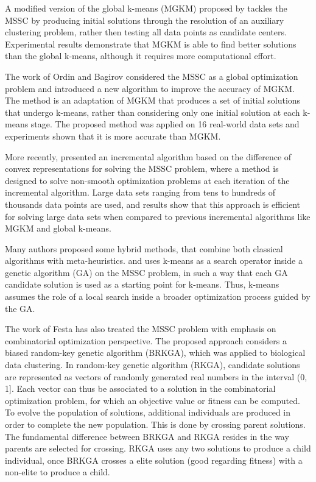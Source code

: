A modified version of the global k-means (MGKM) proposed by \cite{Bagirov2008} tackles the MSSC by producing initial solutions through the resolution of an auxiliary clustering problem, rather then testing all data points as candidate centers. Experimental results demonstrate that MGKM is able to find better solutions than the global k-means, although it requires more computational effort.
 
The work of Ordin and Bagirov \cite{Ordin2014} considered the MSSC as a global optimization problem and introduced a new algorithm to improve the accuracy of MGKM. The method is an adaptation of MGKM that produces a set of initial solutions that undergo k-means, rather than considering only one initial solution at each k-means stage. The proposed method was applied on 16 real-world data sets and experiments shown that it is more accurate than MGKM.

More recently, \cite{Bagirov2016} presented an incremental algorithm based on the difference of convex representations for solving the MSSC problem, where a method is designed to solve non-smooth optimization problems at each iteration of the incremental algorithm. Large data sets ranging from tens to hundreds of thousands data points are used, and results show that this approach is efficient for solving large data sets when compared to previous incremental algorithms like MGKM and global k-means.

Many authors proposed some hybrid methods, that combine both classical algorithms with meta-heuristics. \cite{Krishna1999} and \cite{Lu2004} uses k-means as a search operator inside a genetic algorithm (GA) on the MSSC problem, in such a way that each GA candidate solution is used as a starting point for k-means. Thus, k-means assumes the role of a local search inside a broader optimization process guided by the GA.

The work of Festa \cite{Festa2013} has also treated the MSSC problem with emphasis on combinatorial optimization perspective. The proposed approach considers a biased random-key genetic algorithm (BRKGA), which was applied to biological data clustering. In random-key genetic algorithm (RKGA), candidate solutions are represented as vectors of randomly generated real numbers in the interval (0, 1]. Each vector can thus be associated to a solution in the combinatorial optimization problem, for which an objective value or fitness can be computed. To evolve the population of solutions, additional individuals are produced in order to complete the new population. This is done by crossing parent solutions. The fundamental difference between BRKGA and RKGA resides in the way parents are selected for crossing. RKGA uses any two solutions to produce a child individual, once BRKGA crosses a elite solution (good regarding fitness) with a non-elite to produce a child.



